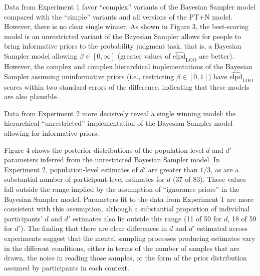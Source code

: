 \documentclass[
  man,floatsintext]{apa6}
\begin{document}
Data from Experiment 1 favor ``complex'' variants of the Bayesian Sampler model compared with the ``simple'' variants and all versions of the PT+N model. However, there is no clear single winner. As shown in Figure 3, the best-scoring model is an unrestricted variant of the Bayesian Sampler allows for people to bring informative priors to the probability judgment task, that is, a Bayesian Sampler model allowing \(\beta \in [0, \infty]\) (greater values of \(\widehat{\text{elpd}}_{\text{LOO}}\) are better). However, the complex and complex hierarchical implementations of the Bayesian Sampler assuming uninformative priors (i.e., restricting \(\beta \in [0,1]\)) have \(\widehat{\text{elpd}}_{\text{LOO}}\) scores within two standard errors of the difference, indicating that these models are also plausible \autocite{sivula.etal2020}.

Data from Experiment 2 more decisively reveal a single winning model: the hierarchical ``unrestricted'' implementation of the Bayesian Sampler model allowing for informative priors.

Figure 4 shows the posterior distributions of the population-level \(d\) and \(d'\) parameters inferred from the unrestricted Bayesian Sampler model. In Experiment 2, population-level estimates of \(d'\) are greater than \(1/3\), as are a substantial number of participant-level estimates for \(d\) (37 of 83). These values fall outside the range implied by the assumption of ``ignorance priors'' in the Bayesian Sampler model. Parameters fit to the data from Experiment 1 are more consistent with this assumption, although a substantial proportion of individual participants' \(d\) and \(d'\) estimates also lie outside this range (11 of 59 for \(d\), 18 of 59 for \(d'\)). The finding that there are clear differences in \(d\) and \(d'\) estimated across experiments suggest that the mental sampling processes producing estimates vary in the different conditions, either in terms of the number of samples that are drawn, the noise in reading those samples, or the form of the prior distribution assumed by participants in each context.
\end{document}
